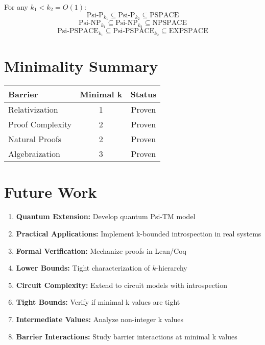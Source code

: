 \documentclass[11pt]{article}
\begin{document}
\begin{theorem}
For any $k_1 < k_2 = O(1)$:
$$\text{Psi-P}_{k_1} \subseteq \text{Psi-P}_{k_2} \subseteq \text{PSPACE}$$
$$\text{Psi-NP}_{k_1} \subseteq \text{Psi-NP}_{k_2} \subseteq \text{NPSPACE}$$
$$\text{Psi-PSPACE}_{k_1} \subseteq \text{Psi-PSPACE}_{k_2} \subseteq \text{EXPSPACE}$$
\end{theorem}

\section{Minimality Summary}

\begin{center}
\begin{tabular}{|l|c|c|}
\hline
\textbf{Barrier} & \textbf{Minimal k} & \textbf{Status} \\
\hline
Relativization & 1 & Proven \\
Proof Complexity & 2 & Proven \\
Natural Proofs & 2 & Proven \\
Algebraization & 3 & Proven \\
\hline
\end{tabular}
\end{center}

\section{Future Work}

\begin{enumerate}
\item \textbf{Quantum Extension:} Develop quantum Psi-TM model
\item \textbf{Practical Applications:} Implement k-bounded introspection in real systems  
\item \textbf{Formal Verification:} Mechanize proofs in Lean/Coq
\item \textbf{Lower Bounds:} Tight characterization of $k$-hierarchy
\item \textbf{Circuit Complexity:} Extend to circuit models with introspection
\item \textbf{Tight Bounds:} Verify if minimal k values are tight
\item \textbf{Intermediate Values:} Analyze non-integer k values
\item \textbf{Barrier Interactions:} Study barrier interactions at minimal k values
\end{enumerate}
\end{document}
